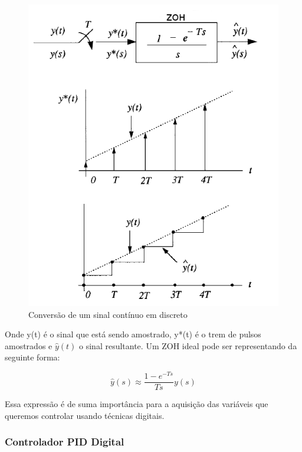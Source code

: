 \begin{figure}[H]
  \caption{Conversão de um sinal contínuo em discreto}
  \begin{center}
      \includegraphics[scale=0.65]{img/zoh_wie_p155}
  \end{center}
  \label{fig:zoh_wie_p155}
\end{figure}

Onde y(t) é o sinal que está sendo amostrado, y*(t) é o trem de pulsos amostrados e $\hat{y}(t)$ o sinal resultante. Um ZOH ideal pode ser representando da seguinte forma:

\begin{equation}
  \hat{y}(s) \approx \frac{1-e^{-Ts}}{Ts}y(s)
\end{equation}

Essa expressão é de suma importância para a aquisição das variáveis que queremos controlar usando técnicas digitais.

\subsubsection{Controlador PID Digital}

